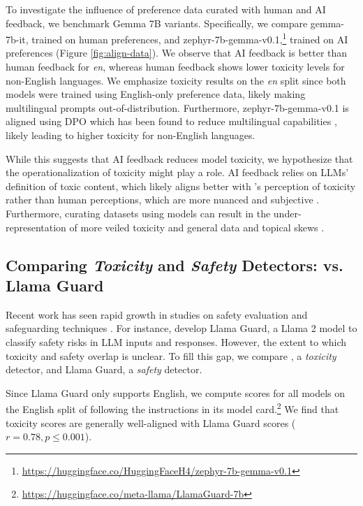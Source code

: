 To investigate the influence of preference data curated with human and AI feedback, we benchmark Gemma 7B \citep{team2024gemma} variants. Specifically, we compare gemma-7b-it, trained on human preferences, and zephyr-7b-gemma-v0.1,\footnote{\url{https://huggingface.co/HuggingFaceH4/zephyr-7b-gemma-v0.1}} trained on AI preferences (Figure \ref{fig:align-data}). We observe that AI feedback is better than human feedback for \textit{en}, whereas human feedback shows lower toxicity levels for non-English languages. We emphasize toxicity results on the \textit{en} split since both models were trained using English-only preference data, likely making multilingual prompts out-of-distribution. Furthermore, zephyr-7b-gemma-v0.1 is aligned using DPO which has been found to reduce multilingual capabilities \citep{ivison2023camels}, likely leading to higher toxicity for non-English languages. 

While this suggests that AI feedback reduces model toxicity, we hypothesize that the operationalization of toxicity might play a role.
AI feedback relies on LLMs' definition of toxic content, which likely aligns better with \perspectiveAPI's perception of toxicity rather than human perceptions, which are more nuanced and subjective \citep{sap2021annotators}.
Furthermore, curating datasets using models can result in the under-representation of more veiled toxicity \citep{han-tsvetkov-2020-fortifying} and general data and topical skews \citep{das2024under}.

\subsection{\textbf{Comparing \textit{Toxicity} and \textit{Safety} Detectors: \perspectiveAPI vs. Llama Guard}}
\label{sec: llg_papi_main}
Recent work has seen rapid growth in studies on safety evaluation and safeguarding techniques \citep{ganguli2022red, mazeika2024harmbench}. For instance, \citet{inan2023llama} develop Llama Guard, a Llama 2 model to classify safety risks in LLM inputs and responses. However, the extent to which toxicity and safety overlap is unclear. To fill this gap, we compare \perspectiveAPI, a \textit{toxicity} detector, and Llama Guard, a \textit{safety} detector.

Since Llama Guard only supports English, we compute scores for all models on the English split of \datasetSmall following the instructions in its model card.\footnote{\url{https://huggingface.co/meta-llama/LlamaGuard-7b}} We find that \perspectiveAPI toxicity scores are generally well-aligned with Llama Guard scores ($r = 0.78, p \leq 0.001$). 

